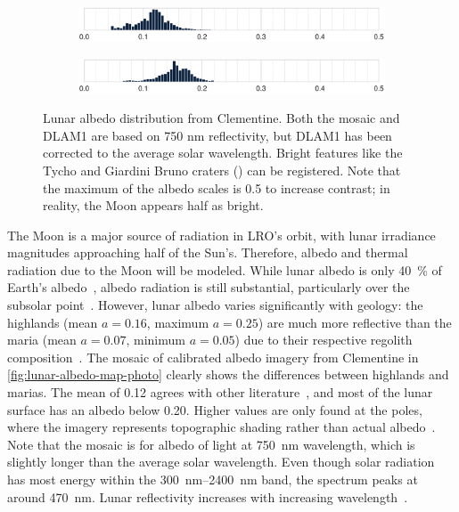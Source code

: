 \begin{figure}[t]
    \begin{subfigure}[c]{0.49\textwidth}
        \includegraphics[width=\textwidth]{figures/plots/lunar_hist_photo.pdf}
    \end{subfigure}
   \hfill
    \begin{subfigure}[c]{0.49\textwidth}
        \includegraphics[width=\textwidth]{figures/plots/lunar_hist_dlam1.pdf}
    \end{subfigure}

   \caption{Lunar albedo distribution from Clementine. Both the mosaic and \acrshort{DLAM1} are based on 750 nm reflectivity, but \acrshort{DLAM1} has been corrected to the average solar wavelength. Bright features like the Tycho and Giardini Bruno craters (\textcolor{mpl-pink}{}) can be registered. Note that the maximum of the albedo scales is 0.5 to increase contrast; in reality, the Moon appears half as bright.}
   \label{fig:lunar-albedo-map}
\end{figure}

The Moon is a major source of radiation in \gls{LRO}'s orbit, with lunar irradiance magnitudes approaching half of the Sun's. Therefore, albedo and thermal radiation due to the Moon will be modeled. While lunar albedo is only \qty{40}{\percent} of Earth's albedo~\cite{Goode2001}, albedo radiation is still substantial, particularly over the subsolar point~\cite{Floberghagen1999}. However, lunar albedo varies significantly with geology: the highlands (mean $a = 0.16$, maximum $a=0.25$) are much more reflective than the maria (mean $a = 0.07$, minimum $a = 0.05$) due to their respective regolith composition~\cite{Vasavada2012,Hayne2017,Sato2014}. The mosaic of calibrated albedo imagery from Clementine in \cref{fig:lunar-albedo-map-photo} clearly shows the differences between highlands and marias. The mean of 0.12 agrees with other literature~\cite{Vasavada2012}, and most of the lunar surface has an albedo below 0.20. Higher values are only found at the poles, where the imagery represents topographic shading rather than actual albedo~\cite{McEwen1997}. Note that the mosaic is for albedo of light at \qty{750}{\nm} wavelength, which is slightly longer than the average solar wavelength. Even though solar radiation has most energy within the \qtyrange{300}{2400}{\nm} band, the spectrum peaks at around \qty{470}{\nm}. Lunar reflectivity increases with increasing wavelength~\cite{Shkuratov2011}.


